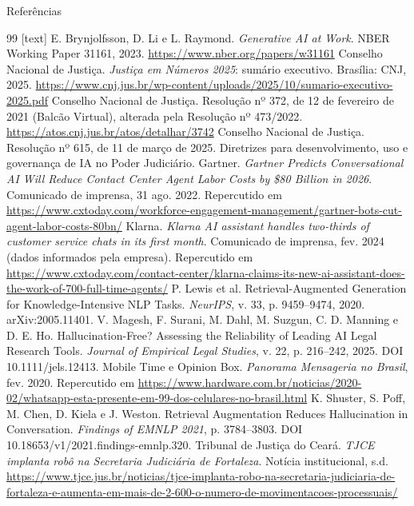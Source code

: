 \documentclass[aspectratio=169,10pt]{beamer}
\begin{document}
\begin{frame}{Referências}
  \tiny
  \begin{thebibliography}{99}
    [text]
     E. Brynjolfsson, D. Li e L. Raymond. \emph{Generative AI at Work}. NBER Working Paper 31161, 2023. \url{https://www.nber.org/papers/w31161}
     Conselho Nacional de Justiça. \emph{Justiça em Números 2025}: sumário executivo. Brasília: CNJ, 2025. \url{https://www.cnj.jus.br/wp-content/uploads/2025/10/sumario-executivo-2025.pdf}
     Conselho Nacional de Justiça. Resolução nº 372, de 12 de fevereiro de 2021 (Balcão Virtual), alterada pela Resolução nº 473/2022. \url{https://atos.cnj.jus.br/atos/detalhar/3742}
     Conselho Nacional de Justiça. Resolução nº 615, de 11 de março de 2025. Diretrizes para desenvolvimento, uso e governança de IA no Poder Judiciário.
     Gartner. \emph{Gartner Predicts Conversational AI Will Reduce Contact Center Agent Labor Costs by \$80 Billion in 2026}. Comunicado de imprensa, 31 ago. 2022. Repercutido em \url{https://www.cxtoday.com/workforce-engagement-management/gartner-bots-cut-agent-labor-costs-80bn/}
     Klarna. \emph{Klarna AI assistant handles two-thirds of customer service chats in its first month}. Comunicado de imprensa, fev. 2024 (dados informados pela empresa). Repercutido em \url{https://www.cxtoday.com/contact-center/klarna-claims-its-new-ai-assistant-does-the-work-of-700-full-time-agents/}
     P. Lewis et al. Retrieval-Augmented Generation for Knowledge-Intensive NLP Tasks. \emph{NeurIPS}, v. 33, p. 9459--9474, 2020. arXiv:2005.11401.
     V. Magesh, F. Surani, M. Dahl, M. Suzgun, C. D. Manning e D. E. Ho. Hallucination-Free? Assessing the Reliability of Leading AI Legal Research Tools. \emph{Journal of Empirical Legal Studies}, v. 22, p. 216--242, 2025. DOI 10.1111/jels.12413.
     Mobile Time e Opinion Box. \emph{Panorama Mensageria no Brasil}, fev. 2020. Repercutido em \url{https://www.hardware.com.br/noticias/2020-02/whatsapp-esta-presente-em-99-dos-celulares-no-brasil.html}
     K. Shuster, S. Poff, M. Chen, D. Kiela e J. Weston. Retrieval Augmentation Reduces Hallucination in Conversation. \emph{Findings of EMNLP 2021}, p. 3784--3803. DOI 10.18653/v1/2021.findings-emnlp.320.
     Tribunal de Justiça do Ceará. \emph{TJCE implanta robô na Secretaria Judiciária de Fortaleza}. Notícia institucional, s.d. \url{https://www.tjce.jus.br/noticias/tjce-implanta-robo-na-secretaria-judiciaria-de-fortaleza-e-aumenta-em-mais-de-2-600-o-numero-de-movimentacoes-processuais/}
  \end{thebibliography}
\end{frame}
\end{document}
